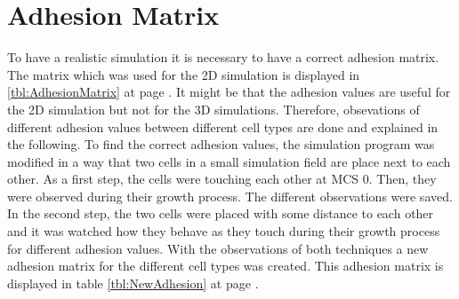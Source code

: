 \section{Adhesion Matrix}\label{sec:AdhesionMatrix}
To have a realistic simulation it is necessary to have a correct adhesion matrix. The matrix which was used for the 2D simulation is displayed in \ref{tbl:AdhesionMatrix} at page \pageref{tbl:AdhesionMatrix}. It might be that the adhesion values are useful for the 2D simulation but not for the 3D simulations. Therefore, obsevations of different adhesion values between different cell types are done and explained in the following. \newline
To find the correct adhesion values, the simulation program was modified in a way that two cells in a small simulation field are place next to each other. As a first step, the cells were touching each other at \ac{MCS} 0. Then, they were observed during their growth process. The different observations were saved. In the second step, the two cells were placed with some distance to each other and it was watched how they behave as they touch during their growth process for different adhesion values. \newline
With the observations of both techniques a new adhesion matrix for the different cell types was created. This adhesion matrix is displayed in table \ref{tbl:NewAdhesion} at page \pageref{tbl:NewAdhesion}.


